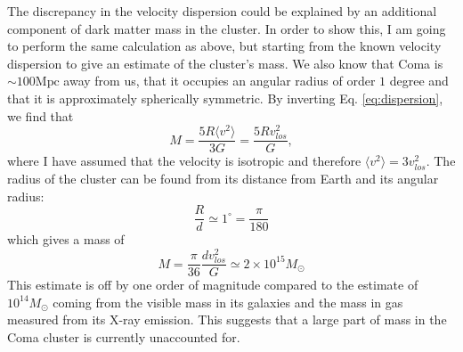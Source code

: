The discrepancy in the velocity dispersion could be explained by an additional component of dark matter mass in the cluster. In order to show this, I am going to perform the same calculation as above, but starting from the known velocity dispersion to give an estimate of the cluster's mass. We also know that Coma is \(\sim 100 \mathrm{Mpc} \) away from us, that it occupies an angular radius of order \(1\) degree and that it is approximately spherically symmetric. By inverting Eq. \eqref{eq:dispersion}, we find that
\begin{equation}
	M= \frac{5R \langle v^2 \rangle }{3G} = \frac{5R v_{los} ^2}{G},
\end{equation}
where I have assumed that the velocity is isotropic and therefore \(\langle v^2 \rangle = 3 v_{los} ^2\). The radius of the cluster can be found from its distance from Earth and its angular radius:
\begin{equation}
	\frac{R}{d} \simeq 1^{\circ} = \frac{\pi}{180}
\end{equation}
which gives a mass of
\begin{equation}
	M=\frac{\pi}{36} \frac{d v_{los} ^2}{G} \simeq 2 \times 10^{15} M_\odot
\end{equation}
This estimate is off by one order of magnitude compared to the estimate of \(10^{14} M_\odot\) coming from the visible mass in its galaxies and the mass in gas measured from its X-ray emission. This suggests that a large part of mass in the Coma cluster is currently unaccounted for.

